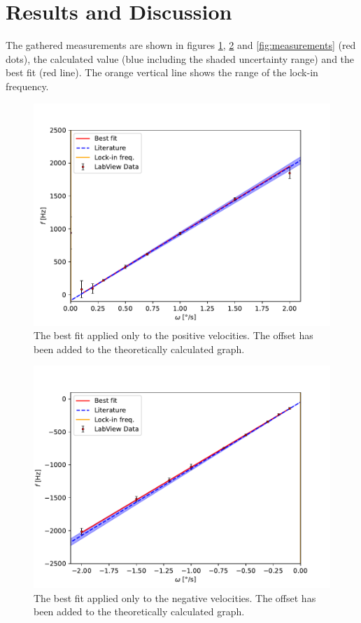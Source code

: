 \newpage
\section{Results and Discussion} \label{sec:results}
The gathered measurements are shown in figures \ref{fig:measurements_pos}, \ref{fig:measurements_neg} and \ref{fig:measurements} (red dots), the calculated value (blue including the shaded uncertainty range) and the best fit (red line). The orange vertical line shows the range of the lock-in frequency.
\begin{figure}[h!]
    \centering
    \includegraphics[width=\textwidth]{Gyroscope/Report/plots/slope_pos.pdf}
    \caption{The best fit applied only to the positive velocities. The offset has been added to the theoretically calculated graph.}
    \label{fig:measurements_pos}
\end{figure}
\begin{figure}[h!]
    \centering
    \includegraphics[width=\textwidth]{Gyroscope/Report/plots/slope_neg.pdf}
    \caption{The best fit applied only to the negative velocities. The offset has been added to the theoretically calculated graph.}
    \label{fig:measurements_neg}
\end{figure}
